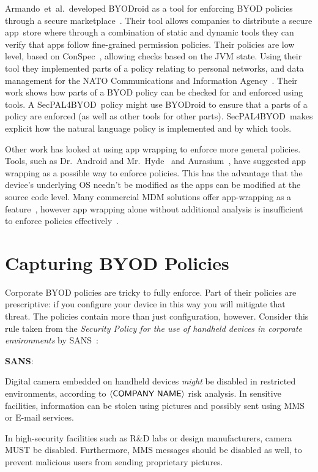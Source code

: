 \documentclass{llncs}
\makeatletter
\newcommand{\etal}{et~al.\@}
\newcommand{\AppPAL}[0]{SecPAL4BYOD}
\newenvironment{policyrule}[1]{%
  \begin{mdframed}\footnotesize
      \noindent\textbf{\sffamily #1}:~\itshape%
}{%
  \end{mdframed}
}
\makeatother
\begin{document}
Armando~\etal~developed BYODroid as a tool for enforcing BYOD policies through a secure marketplace~\cite{armando_enabling_2014}.
Their tool allows companies to distribute a secure app~store where through a combination of static and dynamic tools they can verify that apps follow fine-grained permission policies.
Their policies are low level, based on ConSpec~\cite{aktug_conspec_2008}, allowing checks based on the JVM state.
Using their tool they implemented parts of a policy relating to personal networks, and data management for the NATO Communications and Information Agency~\cite{armando_developing_2016}.
Their work shows how parts of a BYOD policy can be checked for and enforced using tools.
A \AppPAL~policy might use BYODroid to ensure that a parts of a policy are enforced (as well as other tools for other parts).
\AppPAL~makes explicit how the natural language policy is implemented and by which tools.

Other work has looked at using app wrapping to enforce more general policies.
Tools, such as Dr.~Android and Mr.~Hyde~\cite{jeon_dr._2012} and Aurasium~\cite{xu_aurasium:_2012}, have suggested app wrapping as a possible way to enforce policies.
This has the advantage that the device's underlying OS needn't be modified as the apps can be modified at the source code level.
Many commercial \ac{MDM} solutions offer app-wrapping as a feature~\cite{_ibm_????,_app_????}, however app wrapping alone without additional analysis is insufficient to enforce policies effectively~\cite{hao_effectiveness_2013}.


\section{Capturing BYOD Policies}
\label{sec:idea}

Corporate BYOD policies are tricky to fully enforce.
Part of their policies are prescriptive:  if you configure your device in this way you will mitigate that threat.
The policies contain more than just configuration, however.
Consider this rule taken from the \emph{Security Policy for the use of handheld devices in corporate environments} by SANS~\cite{nicholas_r._c._guerin_security_2008}:

\newcommand{\textbra}[1]{\ensuremath{\left\langle \text{\sffamily #1} \right\rangle}}
\begin{policyrule}{SANS}
  Digital camera embedded on handheld devices \emph{might} be disabled in restricted environments, according to \textbra{COMPANY NAME} risk analysis.
  In sensitive facilities, information can be stolen using pictures and possibly sent using MMS or E-mail services.

  In high-security facilities such as R\&D labs or design manufacturers, camera MUST be disabled.
  Furthermore, MMS messages should be disabled as well, to prevent malicious users from sending proprietary pictures.
\end{policyrule}
\end{document}
